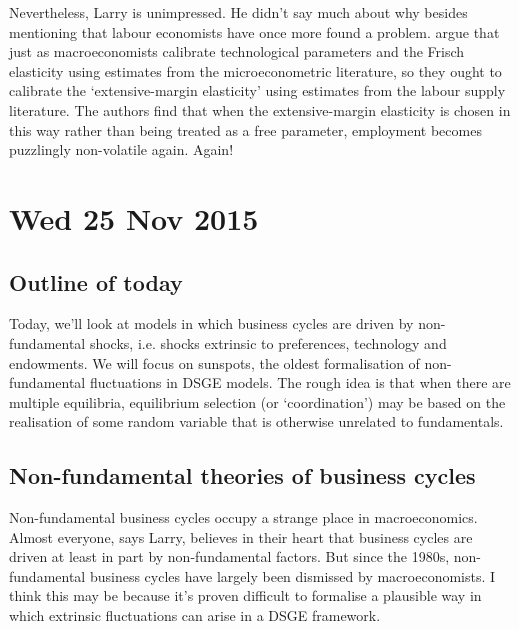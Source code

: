 \documentclass[11pt,letterpaper,reqno,oneside]{article}
\begin{document}
Nevertheless, Larry is unimpressed. He didn't say much about why besides mentioning that labour economists have once more found a problem. \textcite{ChettyEtAl2012} argue that just as macroeconomists calibrate technological parameters and the Frisch elasticity using estimates from the microeconometric literature, so they ought to calibrate the `extensive-margin elasticity' using estimates from the labour supply literature. The authors find that when the extensive-margin elasticity is chosen in this way rather than being treated as a free parameter, employment becomes puzzlingly non-volatile again. Again!



\pagebreak
\section{Wed 25 Nov 2015}
\label{sec:25Nov2015}


\subsection{Outline of today}
\label{sec:25Nov2015:outline_of_today}

Today, we'll look at models in which business cycles are driven by non-fundamental shocks, i.e. shocks extrinsic to preferences, technology and endowments. We will focus on sunspots, the oldest formalisation of non-fundamental fluctuations in DSGE models. The rough idea is that when there are multiple equilibria, equilibrium selection (or `coordination') may be based on the realisation of some random variable that is otherwise unrelated to fundamentals.



\subsection{Non-fundamental theories of business cycles}
\label{sec:25Nov2015:non-fundamental_theories}

Non-fundamental business cycles occupy a strange place in macroeconomics. Almost everyone, says Larry, believes in their heart that business cycles are driven at least in part by non-fundamental factors. But since the 1980s, non-fundamental business cycles have largely been dismissed by macroeconomists. I think this may be because it's proven difficult to formalise a plausible way in which extrinsic fluctuations can arise in a DSGE framework.
\end{document}
